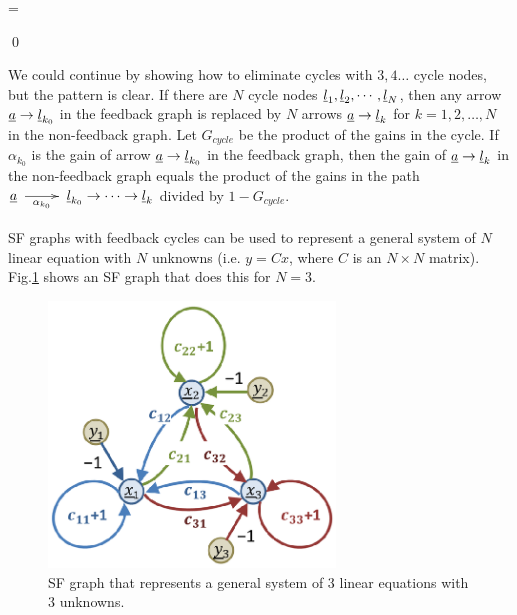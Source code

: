 \beq
{}
=
\left[
\begin{array}{cc}
1&\nu
\\
\mu&1
\end{array}
\right]
\eeq

\qed

We could continue by showing
how to eliminate cycles
with $3, 4\ldots$ cycle nodes,
but
the pattern is clear.
If there are $N$
cycle nodes ${\underline{l}}_1, {\underline{l}}_2,\cdots, {\underline{l}}_N$,
then
any arrow ${\underline{a}}\rightarrow {\underline{l}}_{k_0}$
in the feedback graph
is replaced by $N$ arrows
${\underline{a}}\rightarrow {\underline{l}}_k$
for $k=1,2, \ldots,N$
in the non-feedback graph.
Let $G_{cycle}$
be the product
of the gains in the cycle.
If $\alpha_{k_0}$
is the gain of arrow
${\underline{a}}\rightarrow{\underline{l}}_{k_0}$
in the feedback graph,
then the gain of ${\underline{a}}\rightarrow{\underline{l}}_k$
in the non-feedback graph equals
the product of the gains
in the path  $\rva\maparrow{\alpha_{k_0}}\rvl_{k_0}\rarrow\cdots\rarrow\rvl_k$
divided by $1-G_{cycle}$.


SF graphs 
with feedback cycles can be
used to represent a general
system of $N$ linear equation
with $N$ unknowns (i.e. $y=Cx$,
where $C$ is
an $N\times N$ matrix).
Fig.\ref{fig-flow-graph-3eqs}
shows an SF graph that
does this for $N=3$.


\begin{figure}[h!]
\centering
\includegraphics[width=3in]
{control-th/flow_graph_3eqs.png}
\caption{SF graph
that represents a general
system of 3 linear equations 
with 3 unknowns.}
\label{fig-flow-graph-3eqs}
\end{figure}

